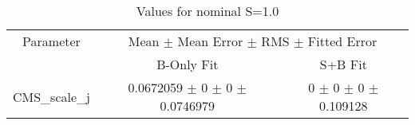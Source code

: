 \begin{table}
\centering
\caption{Values for nominal S=1.0}
\begin{tabular}{ccc}
\toprule
Parameter 	& \multicolumn{2}{c}{Mean $\pm$ Mean Error $\pm$ RMS $\pm$ Fitted Error}\\
 	& B-Only Fit & S+B Fit\\
\midrule
CMS\_scale\_j 	& \num{0.0672059} $\pm$ \num{0} $\pm$ \num{0} $\pm$ \num{0.0746979} 	& \num{0} $\pm$ \num{0} $\pm$ \num{0} $\pm$ \num{0.109128}\\
\bottomrule
\end{tabular}
\end{table}